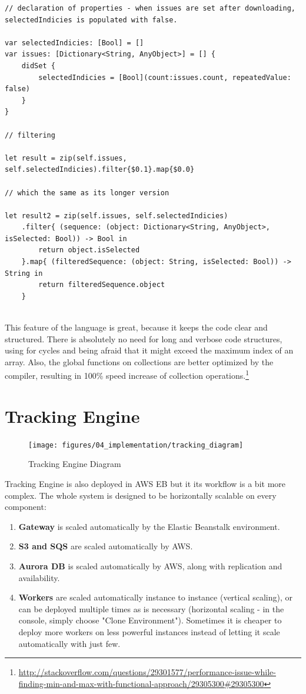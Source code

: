 \begin{lstlisting}
// declaration of properties - when issues are set after downloading, selectedIndicies is populated with false.

var selectedIndicies: [Bool] = []
var issues: [Dictionary<String, AnyObject>] = [] {
    didSet {
        selectedIndicies = [Bool](count:issues.count, repeatedValue: false)
    }
}

// filtering

let result = zip(self.issues, self.selectedIndicies).filter{$0.1}.map{$0.0}

// which the same as its longer version

let result2 = zip(self.issues, self.selectedIndicies)
	.filter{ (sequence: (object: Dictionary<String, AnyObject>, isSelected: Bool)) -> Bool in
		return object.isSelected
	}.map{ (filteredSequence: (object: String, isSelected: Bool)) -> String in
		return filteredSequence.object
	}


\end{lstlisting}

\bigbreak

This feature of the language is great, because it keeps the code clear and structured. There is absolutely no need for long and verbose code structures, using for cycles and being afraid that it might exceed the maximum index of an array. Also, the global functions on collections are better optimized by the compiler, resulting in 100\% speed increase of collection operations.\footnote{\url{http://stackoverflow.com/questions/29301577/performance-issue-while-finding-min-and-max-with-functional-approach/29305300\#29305300}}

\newpage

\section{Tracking Engine}

\begin{figure}[!ht]
	\centering
	\texttt{[image: figures/04\_implementation/tracking\_diagram]}
    \caption{Tracking Engine Diagram}
\end{figure}

Tracking Engine is also deployed in AWS EB but it its workflow is a bit more complex. The whole system is designed to be horizontally scalable on every component:

\begin{enumerate}
	\item {\bf Gateway} is scaled automatically by the Elastic Beanstalk environment.
	\item {\bf S3 and SQS} are scaled automatically by AWS.
	\item {\bf Aurora DB} is scaled automatically by AWS, along with replication and availability.
	\item {\bf Workers} are scaled automatically instance to instance (vertical scaling), or can be deployed multiple times as is necessary (horizontal scaling - in the console, simply choose "Clone Environment"). Sometimes it is cheaper to deploy more workers on less powerful instances instead of letting it scale automatically with just few.
\end{enumerate}

